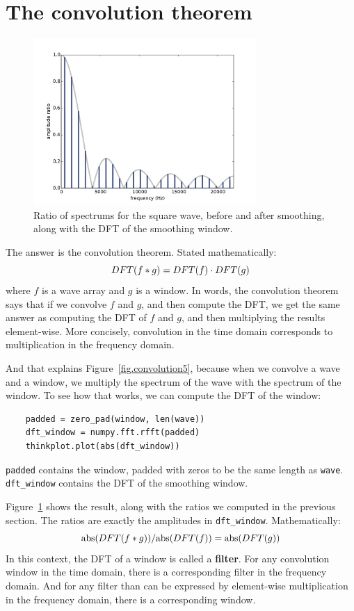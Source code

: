 \documentclass[12pt]{book}
\begin{document}
\section{The convolution theorem}
\label{convtheorem}

\begin{figure}
\centerline{\includegraphics[height=2.5in]{figs/convolution6.pdf}}
\caption{Ratio of spectrums for the square wave, before and after
  smoothing, along with the DFT of the smoothing window.}
\label{fig.convolution6}
\end{figure}

The answer is the convolution theorem.  Stated mathematically:
%
\[ DFT(f \ast g) = DFT(f) \cdot DFT(g) \]
%
where $f$ is a wave array and $g$ is a window.  In words,
the convolution theorem says that if we convolve $f$ and $g$,
and then compute the DFT, we get the same answer as computing
the DFT of $f$ and $g$, and then multiplying the results
element-wise.  More concisely, convolution in the time
domain corresponds to multiplication in the frequency domain.

And that explains Figure~\ref{fig.convolution5}, because when we
convolve a wave and a window, we multiply the spectrum of
the wave with the spectrum of the window.  To see how that works,
we can compute the DFT of the window:

\begin{verbatim}
    padded = zero_pad(window, len(wave))
    dft_window = numpy.fft.rfft(padded)
    thinkplot.plot(abs(dft_window))
\end{verbatim}

{\tt padded} contains the window, padded with zeros to be the
same length as {\tt wave}.  \verb"dft_window" contains the
DFT of the smoothing window.

\newcommand{\abs}{\mathrm{abs}}

Figure~\ref{fig.convolution6} shows the result, along with the
ratios we computed in the previous section.  The ratios are
exactly the amplitudes in \verb"dft_window".  Mathematically:
%
\[ \abs(DFT(f \conv g)) / \abs(DFT(f)) = \abs(DFT(g)) \]
%
In this context, the DFT of a window is called a {\bf filter}.
For any convolution window in the time domain, there is a
corresponding filter in the frequency domain.  And for any
filter than can be expressed by element-wise multiplication in
the frequency domain, there is a corresponding window.
\end{document}
